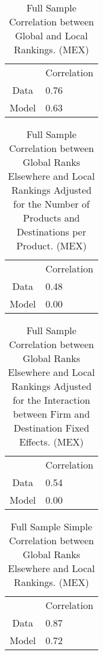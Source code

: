 \documentclass{article}
\begin{document}
\begin{table}[h]
\begin{threeparttable}
\captionsetup{width=0.9\textwidth} %
\caption{Full Sample Correlation between Global and Local Rankings. (MEX)  \label{FS_correlation}}
\begin{tabular}{cl} \hline\hline
             &    Correlation \\\cmidrule{1-2}%
 Data        &    0.76 \\
 Model       &    0.63 \\
\hline\hline
\end{tabular}
\end{threeparttable}
\end{table}
               
\begin{table}[h]
\begin{threeparttable}
\captionsetup{width=0.9\textwidth} %
\caption{Full Sample Correlation between Global Ranks Elsewhere  and Local Rankings Adjusted for the Number of Products and Destinations per Product. (MEX)  \label{FS_correlation}}
\begin{tabular}{cl} \hline\hline
             &    Correlation \\\cmidrule{1-2}%
 Data        &    0.48 \\
 Model       &    0.00 \\
\hline\hline
\end{tabular}
\end{threeparttable}
\end{table}
               
\begin{table}[h]
\begin{threeparttable}
\captionsetup{width=0.9\textwidth} 
\caption{Full Sample Correlation between Global Ranks Elsewhere  and Local Rankings Adjusted for the Interaction between Firm and Destination Fixed Effects. (MEX)  \label{FS_correlation}}
\begin{tabular}{cl} \hline\hline
             &    Correlation \\\cmidrule{1-2}%
 Data        &    0.54 \\
 Model       &    0.00 \\
\hline\hline
\end{tabular}
\end{threeparttable}
\end{table}
               
\begin{table}[h]
\begin{threeparttable}
\captionsetup{width=0.9\textwidth} 
\caption{Full Sample Simple Correlation between Global Ranks Elsewhere  and Local Rankings. (MEX)  \label{FS_correlation}}
\begin{tabular}{cl} \hline\hline
             &    Correlation \\\cmidrule{1-2}%
 Data        &    0.87 \\
 Model       &    0.72 \\
\hline\hline
\end{tabular}
\end{threeparttable}
\end{table}
\end{document}
